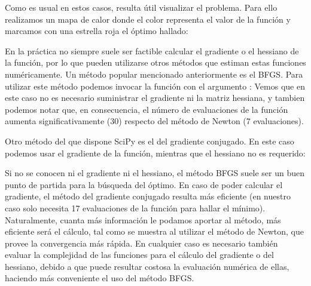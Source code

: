 
Como es usual en estos casos, resulta útil visualizar el problema. Para ello realizamos un mapa de calor donde el color representa el valor de la función y marcamos con una estrella roja el óptimo hallado:


En la práctica no siempre suele ser factible calcular el gradiente o el hessiano de la función, por lo que pueden utilizarse otros métodos que estiman estas funciones numéricamente. Un método popular mencionado anteriormente es el BFGS. Para utilizar este método podemos invocar la función  con el argumento :
Vemos que en este caso no es necesario suministrar el gradiente ni la matriz hessiana, y tambien podemos notar que, en consecuencia, el número de evaluaciones de la función aumenta significativamente (30) respecto del método de Newton (7 evaluaciones).

Otro método del que dispone SciPy es el del gradiente conjugado. En este caso podemos usar el gradiente de la función, mientras que el hessiano no es requerido:

Si no se conocen ni el gradiente ni el hessiano, el método BFGS suele ser un buen punto de partida para la búsqueda del óptimo. En caso de poder calcular el gradiente, el método del gradiente conjugado resulta más eficiente (en nuestro caso solo necesita 17 evaluaciones de la función para hallar el mínimo). Naturalmente, cuanta más información le podamos aportar al método, más eficiente será el cálculo, tal como se muestra al utilizar el método de Newton, que provee la convergencia más rápida. En cualquier caso es necesario también evaluar la complejidad de las funciones para el cálculo del gradiente o del hessiano, debido a que puede resultar costosa la evaluación numérica de ellas, haciendo más conveniente el uso del método BFGS.


